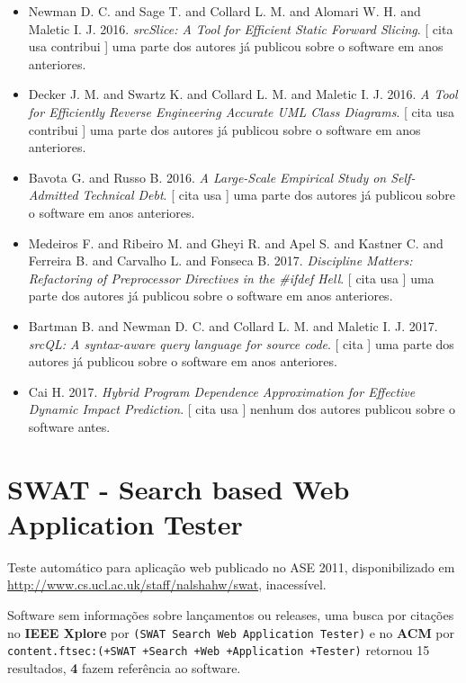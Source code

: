 \begin{itemize}
      [
          cita
          usa
      ]
uma parte dos autores já publicou sobre o software em anos anteriores.
\item Newman D. C. and Sage T. and Collard L. M. and Alomari W. H. and Maletic I. J.
      2016.
        \textit{ srcSlice: A Tool for Efficient Static Forward Slicing}.
      [
          cita
          usa
          contribui
      ]
uma parte dos autores já publicou sobre o software em anos anteriores.
\item Decker J. M. and Swartz K. and Collard L. M. and Maletic I. J.
      2016.
        \textit{ A Tool for Efficiently Reverse Engineering Accurate UML Class Diagrams}.
      [
          cita
          usa
          contribui
      ]
uma parte dos autores já publicou sobre o software em anos anteriores.
\item Bavota G. and Russo B.
      2016.
        \textit{ A Large-Scale Empirical Study on Self-Admitted Technical Debt}.
      [
          cita
          usa
      ]
uma parte dos autores já publicou sobre o software em anos anteriores.
\item Medeiros F. and Ribeiro M. and Gheyi R. and Apel S. and Kastner C. and Ferreira B. and Carvalho L. and Fonseca B.
      2017.
        \textit{ Discipline Matters: Refactoring of Preprocessor Directives in the \#ifdef Hell}.
      [
          cita
          usa
      ]
uma parte dos autores já publicou sobre o software em anos anteriores.
\item Bartman B. and Newman D. C. and Collard L. M. and Maletic I. J.
      2017.
        \textit{ srcQL: A syntax-aware query language for source code}.
      [
          cita
      ]
uma parte dos autores já publicou sobre o software em anos anteriores.
\item Cai H.
      2017.
        \textit{ Hybrid Program Dependence Approximation for Effective Dynamic Impact Prediction}.
      [
          cita
          usa
      ]
nenhum dos autores publicou sobre o software antes.
\end{itemize}
\section{SWAT - Search based Web Application Tester}

Teste automático para aplicação web
publicado no ASE 2011,
disponibilizado em \url{http://www.cs.ucl.ac.uk/staff/nalshahw/swat},
inacessível.

Software sem informações sobre lançamentos ou releases,
uma busca por citações no {\bf IEEE Xplore} por
\texttt{(SWAT Search Web Application Tester)}
e no {\bf ACM} por
\texttt{content.ftsec:(+SWAT +Search +Web +Application +Tester)}
retornou
15 resultados,
{\bf 4} fazem referência ao software.

